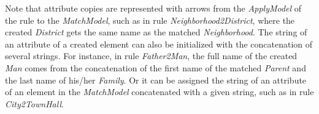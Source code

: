 %



Note that attribute copies are represented with arrows from the \emph{ApplyModel} of the rule to the \emph{MatchModel}, such as in rule \emph{Neighborhood2District}, where the created \emph{District} gets the same name as the matched \emph{Neighborhood}.
The string of an attribute of a created element can also be initialized with the concatenation of several strings.
For instance, in rule \emph{Father2Man}, the full name of the created \emph{Man} comes from the concatenation of the first name of the matched \emph{Parent} and the last name of his/her \emph{Family}.
Or it can be assigned the string of an attribute of an element in the \emph{MatchModel} concatenated with a given string, such as in rule \emph{City2TownHall}.



